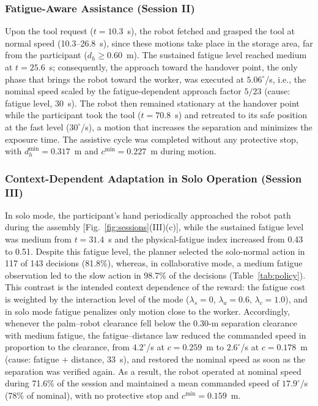\subsubsection{Fatigue-Aware Assistance (Session II)}
Upon the tool request ($t = 10.3$~s), the robot fetched and grasped the tool at normal speed
(10.3--26.8~s), since these motions take place in the storage area, far from the participant
($d_h \ge 0.60$~m). The sustained fatigue level reached medium at $t = 25.6$~s; consequently, the approach
toward the handover point, the only phase that brings the robot toward the worker, was executed at
$5.06^\circ$/s, i.e., the nominal speed scaled by the fatigue-dependent approach factor $5/23$ (cause:
fatigue level, 30~s). The robot then remained stationary at the handover point while the participant took
the tool ($t = 70.8$~s) and retreated to its safe position at the fast level ($30^\circ$/s), a motion that
increases the separation and minimizes the exposure time. The assistive cycle was completed without any
protective stop, with $d_h^{\min} = 0.317$~m and $c^{\min} = 0.227$~m during motion.

\subsubsection{Context-Dependent Adaptation in Solo Operation (Session III)}
In solo mode, the participant's hand periodically approached the robot path during the assembly
[Fig.~\ref{fig:sessions}(III)(c)], while the sustained fatigue level was medium from $t = 31.4$~s and the
physical-fatigue index increased from 0.43 to 0.51. Despite this fatigue level, the planner selected the
solo-normal action in 117 of 143 decisions (81.8\%), whereas, in collaborative mode, a medium fatigue
observation led to the slow action in 98.7\% of the decisions (Table~\ref{tab:policy}). This contrast is the
intended context dependence of the reward: the fatigue cost is weighted by the interaction level of the mode
($\lambda_s = 0$, $\lambda_a = 0.6$, $\lambda_c = 1.0$), and in solo mode fatigue penalizes only motion close
to the worker. Accordingly, whenever the palm--robot clearance fell below the 0.30-m separation clearance
with medium fatigue, the fatigue--distance law reduced the commanded speed in proportion to the clearance,
from $4.2^\circ$/s at $c = 0.259$~m to $2.6^\circ$/s at $c = 0.178$~m (cause: fatigue $+$ distance, 33~s),
and restored the nominal speed as soon as the separation was verified again. As a result, the robot
operated at nominal speed during 71.6\% of the session and maintained a mean commanded speed of
$17.9^\circ$/s (78\% of nominal), with no protective stop and $c^{\min} = 0.159$~m.

